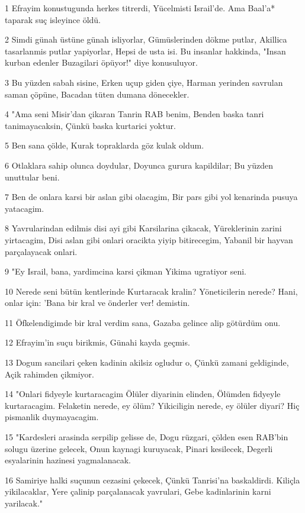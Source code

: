 \par 1 Efrayim konustugunda herkes titrerdi, Yücelmisti Israil'de. Ama Baal'a* taparak suç isleyince öldü.
\par 2 Simdi günah üstüne günah isliyorlar, Gümüslerinden dökme putlar, Akillica tasarlanmis putlar yapiyorlar, Hepsi de usta isi. Bu insanlar hakkinda, "Insan kurban edenler Buzagilari öpüyor!" diye konusuluyor.
\par 3 Bu yüzden sabah sisine, Erken uçup giden çiye, Harman yerinden savrulan saman çöpüne, Bacadan tüten dumana dönecekler.
\par 4 "Ama seni Misir'dan çikaran Tanrin RAB benim, Benden baska tanri tanimayacaksin, Çünkü baska kurtarici yoktur.
\par 5 Ben sana çölde, Kurak topraklarda göz kulak oldum.
\par 6 Otlaklara sahip olunca doydular, Doyunca gurura kapildilar; Bu yüzden unuttular beni.
\par 7 Ben de onlara karsi bir aslan gibi olacagim, Bir pars gibi yol kenarinda pusuya yatacagim.
\par 8 Yavrularindan edilmis disi ayi gibi Karsilarina çikacak, Yüreklerinin zarini yirtacagim, Disi aslan gibi onlari oracikta yiyip bitirecegim, Yabanil bir hayvan parçalayacak onlari.
\par 9 "Ey Israil, bana, yardimcina karsi çikman Yikima ugratiyor seni.
\par 10 Nerede seni bütün kentlerinde Kurtaracak kralin? Yöneticilerin nerede? Hani, onlar için: 'Bana bir kral ve önderler ver! demistin.
\par 11 Öfkelendigimde bir kral verdim sana, Gazaba gelince alip götürdüm onu.
\par 12 Efrayim'in suçu birikmis, Günahi kayda geçmis.
\par 13 Dogum sancilari çeken kadinin akilsiz ogludur o, Çünkü zamani geldiginde, Açik rahimden çikmiyor.
\par 14 "Onlari fidyeyle kurtaracagim Ölüler diyarinin elinden, Ölümden fidyeyle kurtaracagim. Felaketin nerede, ey ölüm? Yikiciligin nerede, ey ölüler diyari? Hiç pismanlik duymayacagim.
\par 15 "Kardesleri arasinda serpilip gelisse de, Dogu rüzgari, çölden esen RAB'bin solugu üzerine gelecek, Onun kaynagi kuruyacak, Pinari kesilecek, Degerli esyalarinin hazinesi yagmalanacak.
\par 16 Samiriye halki suçunun cezasini çekecek, Çünkü Tanrisi'na baskaldirdi. Kiliçla yikilacaklar, Yere çalinip parçalanacak yavrulari, Gebe kadinlarinin karni yarilacak."

